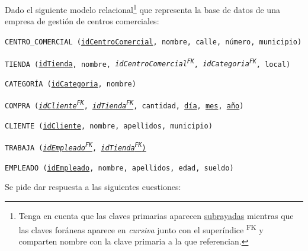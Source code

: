 \documentclass[
    12pt,
    a4paper,
    addpoints,
    answers,
    convocatoria=ord,
    titulacion=NoCD,
    curso=2024/2025,
]{db-exam}
\begin{document}
\begin{questions}
\newpage
\question Dado el siguiente modelo relacional\footnote{Tenga en cuenta que las claves primarias aparecen \underline{subrayadas} mientras que las claves foráneas aparece en \textit{cursiva} junto con el superíndice \textsuperscript{FK} y comparten nombre con la clave primaria a la que referencian.} que representa la base de datos de una empresa de gestión de centros comerciales:

\texttt{CENTRO\_COMERCIAL (\underline{idCentroComercial}, nombre, calle, número, municipio)}

\texttt{TIENDA (\underline{idTienda}, nombre, \textit{idCentroComercial\textsuperscript{FK}}, \textit{idCategoria\textsuperscript{FK}}, local)}

\texttt{CATEGORÍA (\underline{idCategoria}, nombre)}

\texttt{COMPRA (\underline{\textit{idCliente\textsuperscript{FK}}}, \underline{\textit{idTienda\textsuperscript{FK}}}, cantidad, \underline{día}, \underline{mes}, \underline{año})}

\texttt{CLIENTE (\underline{idCliente}, nombre, apellidos, municipio)}

\texttt{TRABAJA (\underline{\textit{idEmpleado\textsuperscript{FK}}}, \underline{\textit{idTienda\textsuperscript{FK}})}}

\texttt{EMPLEADO (\underline{idEmpleado}, nombre, apellidos, edad, sueldo)}

Se pide dar respuesta a las siguientes cuestiones:

\end{questions}
\end{document}
